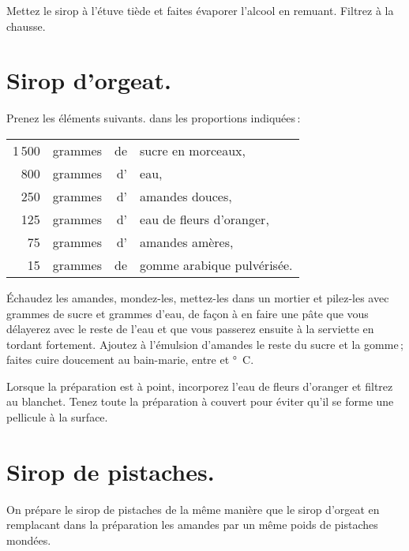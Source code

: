 Mettez le sirop à l'étuve tiède et faites évaporer l'alcool en remuant. Filtrez
à la chausse.

\label{pg0989} \hypertarget{p0989}{}
\section*{\centering Sirop d'orgeat.}
{}

Prenez les éléments suivants. dans les proportions indiquées :

\footnotesize
\begin{longtable}{rrrp{16em}}
  1 500 & grammes & de & sucre en morceaux,                                                               \\
    800 & grammes & d' & eau,                                                                             \\
    250 & grammes & d' & amandes douces,                                                                  \\
    125 & grammes & d' & eau de fleurs d'oranger,                                                         \\
     75 & grammes & d' & amandes amères,                                                                  \\
     15 & grammes & de & gomme arabique pulvérisée.                                                       \\
\end{longtable}
\normalsize

Échaudez les amandes, mondez-les, mettez-les dans un mortier et pilez-les avec
{\mmm} grammes de sucre et {\mmm} grammes d'eau, de façon à en
faire une pâte que vous délayerez avec le reste de l'eau et que vous passerez
ensuite à la serviette en tordant fortement. Ajoutez à l'émulsion d'amandes le
reste du sucre et la gomme ; faites cuire doucement au bain-marie, entre
{\mmm} et {\mmm}° C.

Lorsque la préparation est à point, incorporez l'eau de fleurs d'oranger et
filtrez au blanchet. Tenez toute la préparation à couvert pour éviter qu'il se
forme une pellicule à la surface.

\section*{\centering Sirop de pistaches.}
{}

On prépare le sirop de pistaches de la même manière que le sirop d'orgeat en
remplacant dans la préparation les amandes par un même poids de pistaches
mondées.
